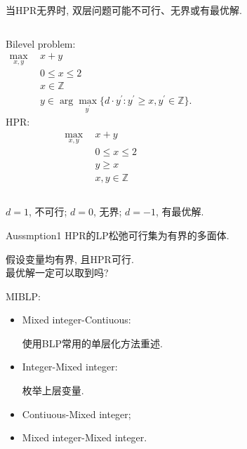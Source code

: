 \documentclass[10pt]{beamer}
\begin{document}
\begin{frame}
	当HPR无界时, 双层问题可能不可行、无界或有最优解. 
	\begin{tcolorbox}
		\begin{columns}[c]
			Bilevel problem:
			\begin{align*}
				\max_{x,y}~~&x+y  \\
				&0\leq x\leq2 \\
				&x\in\mathbb{Z} \\
				&y\in\arg\max_{y^{\prime}}\{d\cdot y^{\prime}:y^{\prime}\geq x,y^{\prime}\in\mathbb{Z}\}.
			\end{align*}
			HPR:
			\begin{align*}
				\max_{x,y}~~&x+y\\
				& 0\leq x\leq2\\
				& y\geq x\\
				& x,y\in\mathbb{Z}
			\end{align*}
		\end{columns}
	\end{tcolorbox}

	$d=1$, 不可行; $d=0$, 无界; $d=-1$, 有最优解.

	\begin{block}{Aussmption1}
		HPR的LP松弛可行集为有界的多面体.
	\end{block}
\end{frame}

\begin{frame}
	\begin{tcolorbox}
		假设变量均有界, 且HPR可行.\\
		最优解一定可以取到吗?
	\end{tcolorbox}
	MIBLP:
	\begin{itemize}
		\item Mixed integer-Contiuous:
		
		使用BLP常用的单层化方法重述.
		\item Integer-Mixed integer:
		
		枚举上层变量.
		\item Contiuous-Mixed integer;
		\item Mixed integer-Mixed integer.
	\end{itemize}
\end{frame}
\end{document}
